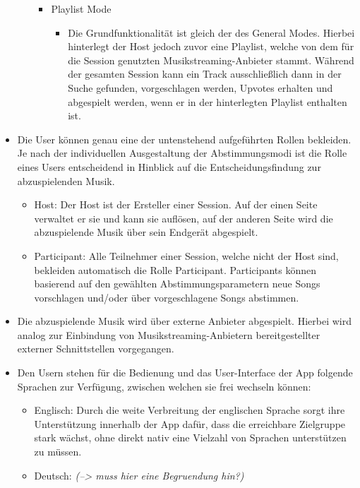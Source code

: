 \documentclass[oneside, ngerman]{sdqtechreport}
\begin{document}
\begin{itemize}
\begin{itemize}
\begin{itemize}
\begin{itemize}
            \end{itemize}
            \item Playlist Mode
            \begin{itemize}
                \item Die Grundfunktionalität ist gleich der des General Modes. Hierbei hinterlegt der Host jedoch zuvor eine Playlist, welche von dem für die Session genutzten Musikstreaming-Anbieter stammt. Während der gesamten Session kann ein Track ausschließlich dann in der Suche gefunden, vorgeschlagen werden, Upvotes erhalten und abgespielt werden, wenn er in der hinterlegten Playlist enthalten ist.
            \end{itemize}
        \end{itemize}

    \end{itemize}
    \item Die User können genau eine der untenstehend aufgeführten Rollen bekleiden. Je nach der individuellen Ausgestaltung der Abstimmungsmodi ist die Rolle eines Users entscheidend in Hinblick auf die Entscheidungsfindung zur abzuspielenden Musik.
    \begin{itemize}
        \item Host: Der Host ist der Ersteller einer Session. Auf der einen Seite verwaltet er sie und kann sie auflösen, auf der anderen Seite wird die abzuspielende Musik über sein Endgerät abgespielt.
        \item Participant: Alle Teilnehmer einer Session, welche nicht der Host sind, bekleiden automatisch die Rolle Participant. Participants können basierend auf den gewählten Abstimmungsparametern neue Songs vorschlagen und/oder über vorgeschlagene Songs abstimmen. 
    \end{itemize}
    \item Die abzuspielende Musik wird über externe Anbieter abgespielt. Hierbei wird analog zur Einbindung von Musikstreaming-Anbietern bereitgestellter externer Schnittstellen vorgegangen.
    \item  Den Usern stehen für die Bedienung und das User-Interface der App folgende Sprachen zur Verfügung, zwischen welchen sie frei wechseln können:
    \begin{itemize}
        \item Englisch: Durch die weite Verbreitung der englischen Sprache sorgt ihre Unterstützung innerhalb der App dafür, dass die erreichbare Zielgruppe stark wächst, ohne direkt nativ eine Vielzahl von Sprachen unterstützen zu müssen.
        \item Deutsch: \textit{(--> muss hier eine Begruendung hin?)}
    \end{itemize}
\end{itemize}
\end{document}
